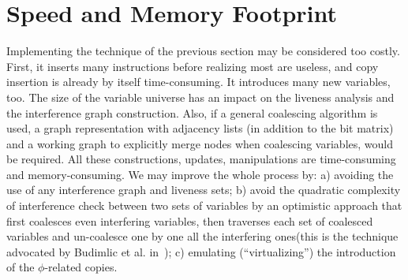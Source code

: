 \section{Speed and Memory Footprint}
Implementing the technique of the previous section may be considered too costly.
First, it inserts many instructions before realizing most are useless, and copy
insertion is already by itself time-consuming. 
It introduces many new variables, too.
The size of the variable universe has an impact on the liveness analysis and
the interference graph construction. Also, if a general coalescing algorithm is used, a
graph representation with adjacency lists (in addition to the bit matrix) and a
working graph to explicitly merge nodes when coalescing variables, would be
required.  All these constructions, updates, manipulations are 
time-consuming and memory-consuming.  We may improve the whole process
by: a) avoiding the use of any interference graph and liveness sets; b) avoid the quadratic complexity of interference check between two sets of variables by an optimistic approach that first coalesces even interfering variables, then traverses each set of coalesced variables and un-coalesce one by one all the interfering ones\ifhab(this is the technique advocated by Budimlic et al. in~\cite{liverange.pldi02})\fi; c) emulating (``virtualizing'') the introduction of the
$\phi$-related copies.

